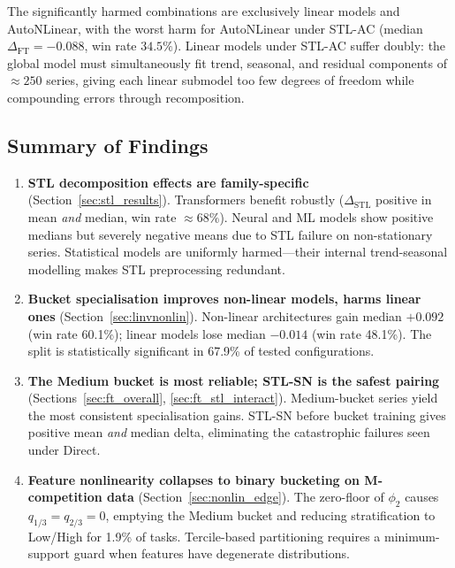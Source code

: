 \documentclass[pdflatex,sn-mathphys-num]{sn-jnl}
\theoremstyle{thmstyleone}
\theoremstyle{thmstyletwo}
\theoremstyle{thmstylethree}
\begin{document}
The significantly harmed combinations are exclusively linear models and
AutoNLinear, with the worst harm for AutoNLinear under STL-AC
(median $\Delta_{\mathrm{FT}} = -0.088$, win rate $34.5\%$).
Linear models under STL-AC suffer doubly: the global model must simultaneously
fit trend, seasonal, and residual components of $\approx\!250$ series, giving
each linear submodel too few degrees of freedom while compounding errors
through recomposition.

\subsection{Summary of Findings}\label{sec:summary}

\begin{enumerate}
  \item \textbf{STL decomposition effects are family-specific}
    (Section~\ref{sec:stl_results}).
    Transformers benefit robustly ($\Delta_{\mathrm{STL}}$ positive in mean
    \emph{and} median, win rate $\approx 68\%$).
    Neural and ML models show positive medians but severely negative means due
    to STL failure on non-stationary series.
    Statistical models are uniformly harmed---their internal trend-seasonal
    modelling makes STL preprocessing redundant.

  \item \textbf{Bucket specialisation improves non-linear models, harms linear
    ones} (Section~\ref{sec:linvnonlin}).
    Non-linear architectures gain median $+0.092$ (win rate 60.1\%); linear
    models lose median $-0.014$ (win rate 48.1\%).
    The split is statistically significant in 67.9\% of tested configurations.

  \item \textbf{The Medium bucket is most reliable; STL-SN is the safest
    pairing} (Sections~\ref{sec:ft_overall}, \ref{sec:ft_stl_interact}).
    Medium-bucket series yield the most consistent specialisation gains.
    STL-SN before bucket training gives positive mean \emph{and} median delta,
    eliminating the catastrophic failures seen under Direct.

  \item \textbf{Feature nonlinearity collapses to binary bucketing on M-competition
    data} (Section~\ref{sec:nonlin_edge}).
    The zero-floor of $\phi_2$ causes $q_{1/3} = q_{2/3} = 0$, emptying the
    Medium bucket and reducing stratification to Low/High for 1.9\% of tasks.
    Tercile-based partitioning requires a minimum-support guard when features
    have degenerate distributions.
\end{enumerate}
\end{document}
